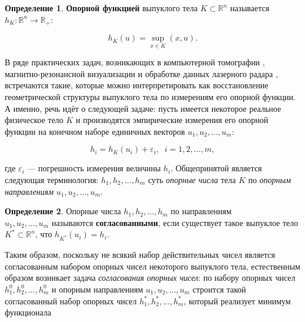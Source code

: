 \documentclass[a4paper, 10pt]{article}
\theoremstyle{definition}
\newtheorem{SmartDefinition}{Определение}
\theoremstyle{plain}
\theoremstyle{plain}
\begin{document}
\begin{SmartDefinition}
 \label{def:support-function}
 \textbf{Опорной функцией} выпуклого тела $K \subset \mathbb{R}^{n}$
 называется
 $h_{K}: \mathbb{R}^{n} \to \mathbb{R}_{+}$:

 \begin{equation*}h_{K}(u) = \sup \limits_{x \in K}(x, u).\end{equation*}
\end{SmartDefinition}

В ряде практических задач, возникающих в компьютерной томографии
\cite{PrinceWillsky}, магнитно-резонансной визуализации
\cite{GregorRannou2001, GregorRannou2002} и обработке данных лазерного радара
\cite{LeleKulkarniWillsky}, встречаются такие, которые можно интерпретировать
как восстановление геометрической структуры выпуклого тела по измерениям его
опорной функции. А именно, речь идёт о следующей задаче: пусть имеется
некоторое реальное физическое тело $K$ и производятся эмпирические измерения
его опорной функции на конечном наборе единичных векторов
$u_{1}, u_{2}, \ldots, u_{m}$:

\begin{equation*}
 h_{i} = h_{K}(u_{i}) + \varepsilon_{i}, \;\; i = 1, 2, \ldots, m,
\end{equation*}

где $\varepsilon_{i}$ --- погрешность измерения величины $h_{i}$. Общепринятой
является следующая терминология: $h_{1}, h_{2}, \ldots, h_{m}$ суть
\textit{опорные числа} тела $K$ по \textit{опорным направлениям}
$u_{1}, u_{2}, \ldots, u_{m}$.

\begin{SmartDefinition}
 \label{def:consistency}
 Опорные числа $h_{1}, h_{2}, \ldots, h_{m}$ по направлениям \\
 $u_{1}, u_{2}, \ldots, u_{m}$ называются \textbf{согласованными}, если
 существует такое выпуклое тело  $K^{*} \subset \mathbb{R}^{n}$, что
 $h_{K^{*}}(u_{i}) = h_{i}$.
\end{SmartDefinition}

Таким образом, поскольку не всякий набор действительных чисел является
согласованным набором опорных чисел некоторого выпуклого тела, естественным
образом возникает задача \textit{согласования опорных чисел}: по набору опорных
чисел $h^{0}_{1}, h^{0}_{2}, \ldots, h^{0}_{m}$ и опорным направлениям
$u_{1}, u_{2}, \ldots, u_{m}$ строится такой согласованный набор опорных чисел
$h^{*}_{1}, h^{*}_{2}, \ldots, h^{*}_{m}$, который реализует минимум функционала
\end{document}
